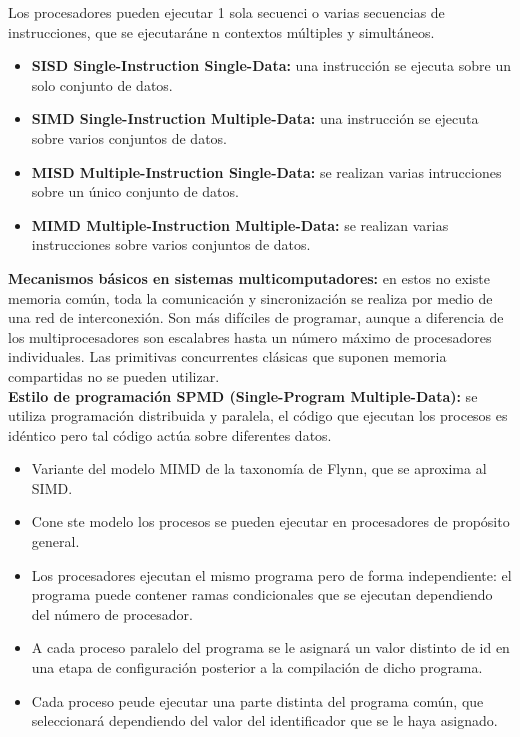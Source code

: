 \documentclass[a4paper,11pt]{article}
\begin{document}
Los procesadores pueden ejecutar 1 sola secuenci o varias secuencias de instrucciones, que se ejecutaráne n contextos múltiples y simultáneos.

\begin{itemize}
\item \textbf{SISD Single-Instruction Single-Data:} una instrucción se ejecuta sobre un solo conjunto de datos.

\item \textbf{SIMD Single-Instruction Multiple-Data:} una instrucción se ejecuta sobre varios conjuntos de datos.

\item \textbf{MISD Multiple-Instruction Single-Data:} se realizan varias intrucciones sobre un único conjunto de datos.

\item \textbf{MIMD Multiple-Instruction Multiple-Data:} se realizan varias instrucciones sobre varios conjuntos de datos.
\end{itemize}

\textbf{Mecanismos básicos en sistemas multicomputadores:} en estos no existe memoria común, toda la comunicación y sincronización se realiza por medio de una red de interconexión. Son más difíciles de programar, aunque a diferencia de los multiprocesadores son escalabres hasta un número máximo de procesadores individuales. Las primitivas concurrentes clásicas que suponen memoria compartidas no se pueden utilizar. \\

\textbf{Estilo de programación SPMD (Single-Program Multiple-Data):} se utiliza programación distribuida y paralela, el código que ejecutan los procesos es idéntico pero tal código actúa sobre diferentes datos.

\begin{itemize}
\item Variante del modelo MIMD de la taxonomía de Flynn, que se aproxima al SIMD.

\item Cone ste modelo los procesos se pueden ejecutar en procesadores de propósito general.

\item Los procesadores ejecutan el mismo programa pero de forma independiente: el programa puede contener ramas condicionales que se ejecutan dependiendo del número de procesador.

\item A cada proceso paralelo del programa se le asignará un valor distinto de id en una etapa de configuración posterior a la compilación de dicho programa.

\item Cada proceso peude ejecutar una parte distinta del programa común, que seleccionará dependiendo del valor del identificador que se le haya asignado.
\end{itemize}
\end{document}
